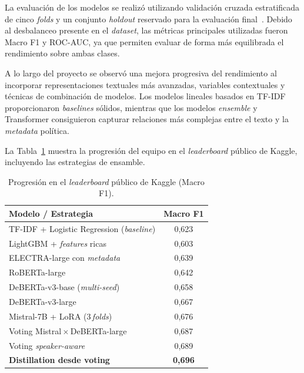 \documentclass[12pt,a4paper]{article}
\begin{document}
La evaluación de los modelos se realizó utilizando validación cruzada estratificada de cinco \emph{folds} y un conjunto \emph{holdout} reservado para la evaluación final~\cite{sklearn}. Debido al desbalanceo presente en el \emph{dataset}, las métricas principales utilizadas fueron Macro F1 y ROC-AUC, ya que permiten evaluar de forma más equilibrada el rendimiento sobre ambas clases.

A lo largo del proyecto se observó una mejora progresiva del rendimiento al incorporar representaciones textuales más avanzadas, variables contextuales y técnicas de combinación de modelos. Los modelos lineales basados en TF-IDF proporcionaron \emph{baselines} sólidos, mientras que los modelos \emph{ensemble} y Transformer consiguieron capturar relaciones más complejas entre el texto y la \emph{metadata} política.

La Tabla~\ref{tab:kaggle} muestra la progresión del equipo en el \emph{leaderboard} público de Kaggle, incluyendo las estrategias de ensamble.

\begin{table}[H]
  \centering
  \caption{Progresión en el \emph{leaderboard} público de Kaggle (Macro F1).}
  \label{tab:kaggle}
  {\small
  \renewcommand{\arraystretch}{0.95}
  \begin{tabular}{lc}
    \toprule
    \textbf{Modelo / Estrategia}                   & \textbf{Macro F1} \\
    \midrule
    TF-IDF + Logistic Regression (\emph{baseline}) & 0,623 \\
    LightGBM + \emph{features} ricas               & 0,603 \\
    ELECTRA-large con \emph{metadata}              & 0,639 \\
    RoBERTa-large                                  & 0,642 \\
    DeBERTa-v3-base (\emph{multi-seed})            & 0,658 \\
    DeBERTa-v3-large                               & 0,667 \\
    Mistral-7B + LoRA (3\,\emph{folds})            & 0,676 \\
    Voting Mistral\,$\times$\,DeBERTa-large        & 0,687 \\
    Voting \emph{speaker-aware}                    & 0,689 \\
    \textbf{Distillation desde voting}             & \textbf{0,696} \\
    \bottomrule
  \end{tabular}}
\end{table}
\end{document}
